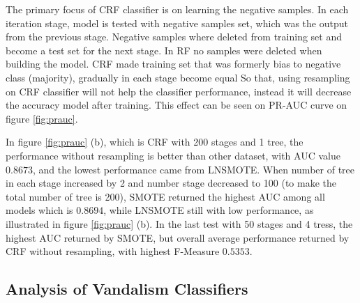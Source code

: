 \documentclass[conference,compsoc,a4paper,twocolumn,final]{IEEEtran}
\begin{document}
The primary focus of CRF classifier is on learning the negative samples.
In each iteration stage, model is tested with negative samples set, which was
the output from the previous stage.
Negative samples where deleted from training set and become a test set for the
next stage.
In RF no samples were deleted when building the model.
CRF made training set that was formerly bias to negative class (majority),
gradually in each stage become equal
So that, using resampling on CRF classifier will not help the classifier
performance, instead it will decrease the accuracy model after training.
This effect can be seen on PR-AUC curve on figure \ref{fig:prauc}.

In figure \ref{fig:prauc} (b), which is CRF with 200 stages and 1 tree, the
performance without resampling is better than other dataset, with AUC
value $0.8673$, and the lowest performance came from LNSMOTE.
When number of tree in each stage increased by 2 and number stage decreased to
100 (to make the total number of tree is 200), SMOTE returned the highest AUC
among all models which is $0.8694$, while LNSMOTE still with low performance,
as illustrated in figure \ref{fig:prauc} (b).
In the last test with 50 stages and 4 tress, the highest AUC returned by SMOTE,
but overall average performance returned by CRF without resampling, with
highest F-Measure $0.5353$.

\subsection{Analysis of Vandalism Classifiers}
\end{document}
